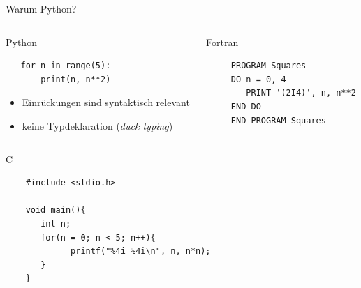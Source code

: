 \documentclass[t, utf8, 10pt]{beamer}
\begin{document}
\begin{frame}[fragile]{Warum Python?}

 \vspace{0.3truecm}
 \begin{columns}[t]
  \begin{column}{0.5\textwidth}
   Python
   \lstset{style=custompython}
   \begin{lstlisting}
   for n in range(5):
       print(n, n**2)
   \end{lstlisting}

   \begin{footnotesize}
    \begin{itemize}
     \setlength{\itemindent}{-10pt}
     \item Einrückungen sind syntaktisch relevant
     \item keine Typdeklaration (\textit{duck typing})
    \end{itemize}
   \end{footnotesize}
  \end{column}
  \begin{column}{0.5\textwidth}
   Fortran
   \lstset{style=customfortran}
   \begin{lstlisting}
     PROGRAM Squares
     DO n = 0, 4
        PRINT '(2I4)', n, n**2
     END DO
     END PROGRAM Squares
   \end{lstlisting}
  \end{column}
 \end{columns}
  
 \vspace{0.5truecm}
 \begin{columns}
  \begin{column}{0.7\textwidth}
   C
   \lstset{style=customc}
   \begin{lstlisting}
    #include <stdio.h>

    void main(){
       int n;
       for(n = 0; n < 5; n++){
             printf("%4i %4i\n", n, n*n);
       }
    }
   \end{lstlisting}
  \end{column}
  \begin{column}{0.3\textwidth}
   \strut
  \end{column}
 \end{columns}
\end{frame}
\end{document}
